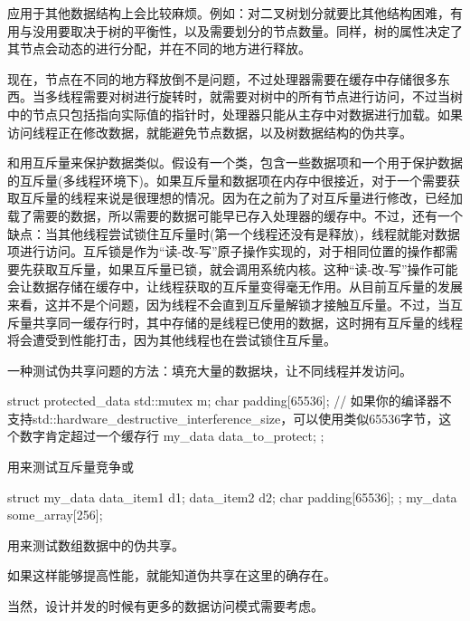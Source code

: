 应用于其他数据结构上会比较麻烦。例如：对二叉树划分就要比其他结构困难，有用与没用要取决于树的平衡性，以及需要划分的节点数量。同样，树的属性决定了其节点会动态的进行分配，并在不同的地方进行释放。

现在，节点在不同的地方释放倒不是问题，不过处理器需要在缓存中存储很多东西。当多线程需要对树进行旋转时，就需要对树中的所有节点进行访问，不过当树中的节点只包括指向实际值的指针时，处理器只能从主存中对数据进行加载。如果访问线程正在修改数据，就能避免节点数据，以及树数据结构的伪共享。

和用互斥量来保护数据类似。假设有一个类，包含一些数据项和一个用于保护数据的互斥量(多线程环境下)。如果互斥量和数据项在内存中很接近，对于一个需要获取互斥量的线程来说是很理想的情况。因为在之前为了对互斥量进行修改，已经加载了需要的数据，所以需要的数据可能早已存入处理器的缓存中。不过，还有一个缺点：当其他线程尝试锁住互斥量时(第一个线程还没有是释放)，线程就能对数据项进行访问。互斥锁是作为“读-改-写”原子操作实现的，对于相同位置的操作都需要先获取互斥量，如果互斥量已锁，就会调用系统内核。这种“读-改-写”操作可能会让数据存储在缓存中，让线程获取的互斥量变得毫无作用。从目前互斥量的发展来看，这并不是个问题，因为线程不会直到互斥量解锁才接触互斥量。不过，当互斥量共享同一缓存行时，其中存储的是线程已使用的数据，这时拥有互斥量的线程将会遭受到性能打击，因为其他线程也在尝试锁住互斥量。

一种测试伪共享问题的方法：填充大量的数据块，让不同线程并发访问。

\begin{cpp}
struct protected_data
{
  std::mutex m;
  char padding[65536];  // 如果你的编译器不支持std::hardware_destructive_interference_size，可以使用类似65536字节，这个数字肯定超过一个缓存行
  my_data data_to_protect;
};
\end{cpp}

用来测试互斥量竞争或

\begin{cpp}
struct my_data
{
  data_item1 d1;
  data_item2 d2;
  char padding[65536];
};
my_data some_array[256];
\end{cpp}

用来测试数组数据中的伪共享。

如果这样能够提高性能，就能知道伪共享在这里的确存在。

当然，设计并发的时候有更多的数据访问模式需要考虑。